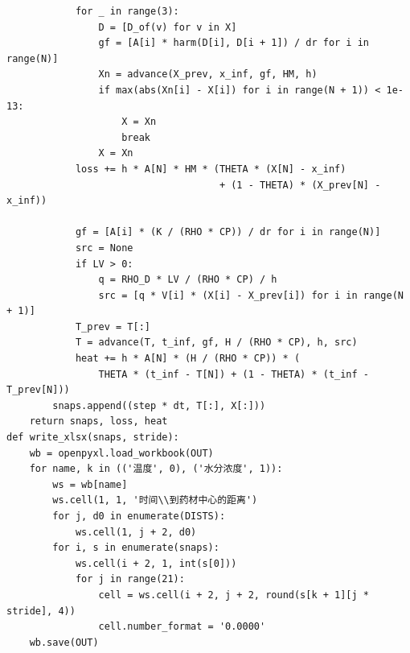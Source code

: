 \documentclass[12pt,a4paper]{article}
\begin{document}
\begin{lstlisting}
            for _ in range(3):                        
                D = [D_of(v) for v in X]
                gf = [A[i] * harm(D[i], D[i + 1]) / dr for i in range(N)]
                Xn = advance(X_prev, x_inf, gf, HM, h)
                if max(abs(Xn[i] - X[i]) for i in range(N + 1)) < 1e-13:
                    X = Xn
                    break
                X = Xn
            loss += h * A[N] * HM * (THETA * (X[N] - x_inf)
                                     + (1 - THETA) * (X_prev[N] - x_inf))

            gf = [A[i] * (K / (RHO * CP)) / dr for i in range(N)]
            src = None
            if LV > 0:                                
                q = RHO_D * LV / (RHO * CP) / h
                src = [q * V[i] * (X[i] - X_prev[i]) for i in range(N + 1)]
            T_prev = T[:]
            T = advance(T, t_inf, gf, H / (RHO * CP), h, src)
            heat += h * A[N] * (H / (RHO * CP)) * (
                THETA * (t_inf - T[N]) + (1 - THETA) * (t_inf - T_prev[N]))
        snaps.append((step * dt, T[:], X[:]))
    return snaps, loss, heat
def write_xlsx(snaps, stride):
    wb = openpyxl.load_workbook(OUT)
    for name, k in (('温度', 0), ('水分浓度', 1)):
        ws = wb[name]
        ws.cell(1, 1, '时间\\到药材中心的距离')
        for j, d0 in enumerate(DISTS):
            ws.cell(1, j + 2, d0)
        for i, s in enumerate(snaps):
            ws.cell(i + 2, 1, int(s[0]))
            for j in range(21):
                cell = ws.cell(i + 2, j + 2, round(s[k + 1][j * stride], 4))
                cell.number_format = '0.0000'
    wb.save(OUT)


\end{lstlisting}
\end{document}
